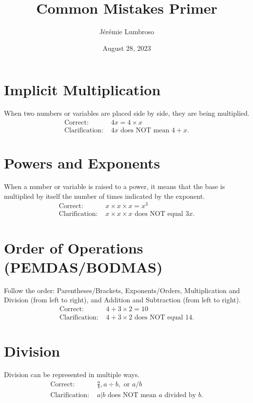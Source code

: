 \documentclass[12pt]{article}
\title{Common Mistakes Primer}
\author{Jérémie Lumbroso}
\date{August 28, 2023}
\begin{document}
\maketitle

\section*{Implicit Multiplication}
When two numbers or variables are placed side by side, they are being multiplied.
\begin{align*}
    \text{Correct: } & 4x = 4 \times x \\
    \text{Clarification: } & 4x \text{ does NOT mean } 4 + x.
\end{align*}

\section*{Powers and Exponents}
When a number or variable is raised to a power, it means that the base is multiplied by itself the number of times indicated by the exponent.
\begin{align*}
    \text{Correct: } & x \times x \times x = x^3 \\
    \text{Clarification: } & x \times x \times x \text{ does NOT equal } 3x.
\end{align*}

\section*{Order of Operations (PEMDAS/BODMAS)}
Follow the order: Parentheses/Brackets, Exponents/Orders, Multiplication and Division (from left to right), and Addition and Subtraction (from left to right).
\begin{align*}
    \text{Correct: } & 4 + 3 \times 2 = 10 \\
    \text{Clarification: } & 4 + 3 \times 2 \text{ does NOT equal } 14.
\end{align*}

\section*{Division}
Division can be represented in multiple ways.
\begin{align*}
    \text{Correct: } & \frac{a}{b}, a \div b, \text{ or } a/b \\
    \text{Clarification: } & a|b \text{ does NOT mean } a \text{ divided by } b.
\end{align*}
\end{document}
